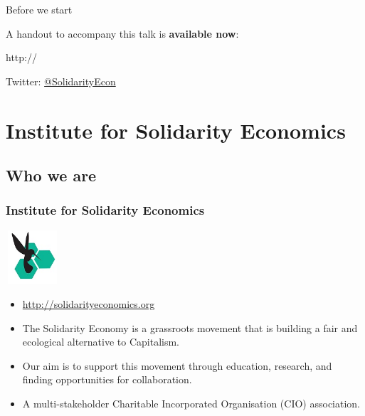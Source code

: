 \begin{frame}{Before we start}
  \begin{center}
    A handout to accompany this talk is \textbf{available now}:

    http://

    Twitter: \href{https://twitter.com/SolidarityEcon}{@SolidarityEcon}
  \end{center}
\end{frame}
\frame{\titlepage}

\frame{\tableofcontents}

\section{Institute for Solidarity Economics}
\subsection{Who we are}
\frame
{
  \frametitle{Institute for Solidarity Economics}
  \begin{center}
    \includegraphics[height=2cm,width=2cm]{ise-logo.jpg}
  \end{center}
  \begin{itemize}
    \item<1-> \url{http://solidarityeconomics.org}
    \item<1-> The Solidarity Economy is a grassroots movement that is building a fair and ecological alternative to Capitalism.
    \item<2-> Our aim is to support this movement through education, research, and finding opportunities for collaboration.
    \item<3-> A multi-stakeholder Charitable Incorporated Organisation (CIO) association.
  \end{itemize}
}
